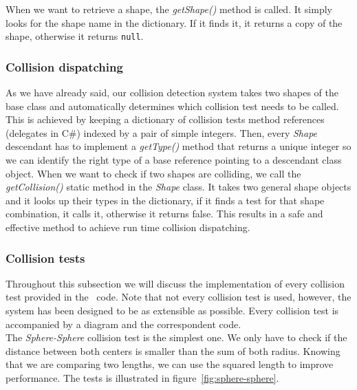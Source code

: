 

When we want to retrieve a shape, the \textit{getShape()} method is called. It simply
looks for the shape name in the dictionary. If it finds it, it returns a copy of the
shape, otherwise it returns \texttt{null}.\\



\subsubsection{Collision dispatching}

As we have already said, our collision detection system takes two shapes of the base class
and automatically determines which collision test needs to be called. This is achieved by
keeping a dictionary of collision tests method references (delegates in C\#) indexed by
a pair of simple integers. Then, every \textit{Shape} descendant has to implement a
\textit{getType()} method that returns a unique integer so we can identify the right
type of a base reference pointing to a descendant class object. When we want to check if
two shapes are colliding, we call the \textit{getCollision()} static method in the
\textit{Shape} class. It takes two general shape objects and it looks up their types
in the dictionary, if it finds a test for that shape combination, it calls it, otherwise
it returns false. This results in a safe and effective method to achieve run time collision
dispatching.\\




\subsubsection{Collision tests}

Throughout this subsection we will discuss the implementation of every collision test provided
in the \game\ code. Note that not every collision test is used, however, the system has been
designed to be as extensible as possible. Every collision test is accompanied by a diagram
and the correspondent code.\\

The \textit{Sphere-Sphere} collision test is the simplest one. We only have to check if
the distance between both centers is smaller than the sum of both radius. Knowing that we are
comparing two lengths, we can use the squared length to improve performance. The tests is
illustrated in figure~\ref{fig:sphere-sphere}.\\

